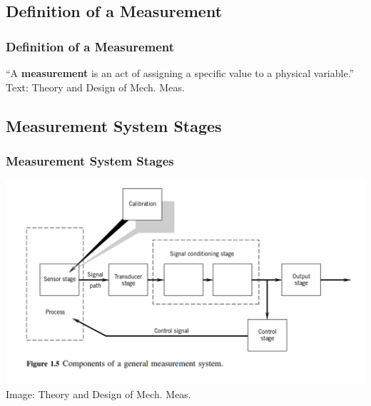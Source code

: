 \documentclass[fleqn]{beamer} %
\newcommand{\sectionIsubsectionItitle}{Definition of a Measurement}
\newcommand{\sectionIsubsectionIItitle}{Measurement System Stages}
\begin{document}
		\subsection{\sectionIsubsectionItitle}\label{sectionIsubsectionI}

			\begin{frame}
				\frametitle{\sectionIsubsectionItitle}

				\large{``A {\bf \BL measurement} is an act of assigning a specific value to a physical variable.''} \vspc
				{\tiny Text: Theory and Design of Mech. Meas.}

			\end{frame}

		\subsection{\sectionIsubsectionIItitle}\label{sectionIsubsectionII}

			\begin{frame}
				\frametitle{\sectionIsubsectionIItitle}

				\includegraphics[scale=.3]{images/measurement_stages.png} \\
				{\tiny Image: Theory and Design of Mech. Meas.}
			\end{frame}
\end{document}
